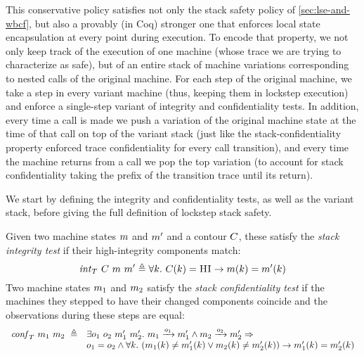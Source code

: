 \documentclass[acmsmall,review,anonymous]{acmart}\settopmatter{printfolios=true,printccs=false,printacmref=false}
\begin{document}
{This conservative policy satisfies not only the stack safety policy of
\cref{sec:lse-and-wbcf},
but also a provably (in Coq) stronger one that enforces local state
encapsulation at every point during execution. To encode that
property, we not only keep track of the execution of one machine
(whose trace we are trying to characterize as safe), but of an entire
stack of machine variations corresponding to nested calls of the
original machine. For each step of the original machine, we take a
step in every variant machine (thus, keeping them in lockstep
execution) and enforce a single-step variant of integrity and
confidentiality tests. In addition, every time a call is made we push
a variation of the original machine state at the time of that call on
top of the variant stack (just like the stack-confidentiality property
enforced trace confidentiality for every call transition), and every time
the machine returns from a call we pop the top variation (to account
for stack confidentiality taking the prefix of the transition trace
until its return).

We start by defining the integrity and confidentiality tests, as well
as the variant stack, before giving the full definition of lockstep
stack safety.

\newcommand{\vse}{\mathit{vse}}
\newcommand{\VSES}{\mathit{VSE}}
\newcommand{\vs}{\mathit{vs}}
\newcommand{\VSS}{\mathit{VS}}

\newcommand*{\vm}[1]{\ensuremath{\mathit{vm}_{#1}}}
\newcommand*{\testInt}[3]{\ensuremath{\mathit{int}_T ~ #1 ~ #2 ~ #3}}
\newcommand*{\testConf}[2]{\ensuremath{\mathit{conf}_T ~ #1 ~ #2}}
\newcommand*{\testVS}[2]{\ensuremath{\mathit{\vs}_T ~ #1 ~ #2}}
\newcommand*{\testProp}[3]{\ensuremath{\mathit{stack}_T ~ #1 ~ #2 ~ #3}}

  Given two machine states $m$ and $m'$ and a contour $C$, these
  satisfy the \emph{stack integrity test} if their high-integrity components
  match:
  \[
    \testInt{\contour}{\mach}{\mach'} \triangleq
    \forall \component . ~
    \contour(\component) = \HIGHINT \rightarrow
    \mach(\component) = \mach'(\component)
    \]
    \ifaftersubmission
{}
\fi
{} Two machine states $m_1$ and $m_2$ satisfy the
\emph{stack confidentiality test} if the machines they stepped to
have their changed components coincide and the observations during
these steps are equal:
\[
\begin{array}{rl}
  \mathit{conf}_T ~ m_1 ~ m_2 ~ \triangleq &
  \exists o_1 ~ o_2 ~ m_1' ~ m_2'. ~
  m_1 \xrightarrow{o_1} m_1' \wedge m_2 \xrightarrow{o_2} m_2' \Rightarrow \\
&    o_1 = o_2 \wedge \forall k . ~
   (     m_1(k) \neq m_1'(k)
    \vee m_2(k) \neq m_2'(k))
    \rightarrow m_1'(k) = m_2'(k)
\end{array}
\]
\ifaftersubmission
{}
\fi

}
\end{document}
